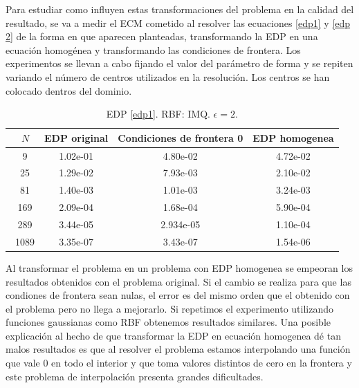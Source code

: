 \documentclass[11pt,a4paper]{article}
\begin{document}
Para estudiar como influyen estas transformaciones del problema en la calidad del resultado, se va a medir el ECM cometido al resolver las ecuaciones \ref{edp1} y \ref{edp 2} de la forma en que aparecen planteadas, transformando la EDP en una ecuación homogénea y transformando las condiciones de frontera. Los experimentos se llevan a cabo fijando el valor del parámetro de forma y se repiten variando el número de centros utilizados en la resolución. Los centros se han colocado dentros del dominio. 

\begin{table}[H]
\centering
\caption{EDP \ref{edp1}. RBF: IMQ. $\epsilon=2$.}
\begin{tabular}{|c|c|c|c|}
\hline
\ $N$ & EDP original & Condiciones de frontera 0 & EDP homogenea \\
\hline
\ 9 & 1.02e-01 & 4.80e-02 & 4.72e-02 \\
\ 25 & 1.29e-02 & 7.93e-03 & 2.10e-02 \\
\ 81 & 1.40e-03 & 1.01e-03& 3.24e-03 \\
\ 169 & 2.09e-04 & 1.68e-04&5.90e-04\\
\ 289 & 3.44e-05&2.934e-05&1.10e-04\\
\ 1089 & 3.35e-07&3.43e-07&1.54e-06\\
\hline  
\end{tabular}
\end{table}



Al transformar el problema en un problema con EDP homogenea se empeoran los resultados obtenidos con el problema original. Si el cambio se realiza para que las condiones de frontera sean nulas, el error es del mismo orden que el obtenido con el problema pero no llega a mejorarlo.  Si repetimos el experimento utilizando funciones gaussianas como RBF obtenemos resultados similares. Una posible explicación al hecho de que transformar la EDP en ecuación homogenea dé tan malos resultados es que al resolver el problema estamos interpolando una función que vale 0 en todo el interior y que toma valores distintos de cero en la frontera y este problema de interpolación presenta grandes dificultades. 
\end{document}
